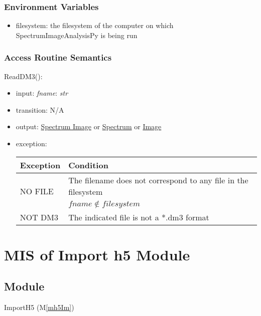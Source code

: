 \documentclass[12pt, titlepage]{article}
\newcommand{\mref}[1]{M\ref{#1}}
\newcommand{\progname}{SpectrumImageAnalysisPy}
\begin{document}
\subsubsection{Environment Variables}
\begin{itemize}
    \item filesystem: the filesystem of the computer on which \progname{} is being
    run
\end{itemize}
\subsubsection{Access Routine Semantics}

\noindent ReadDM3():
\begin{itemize}
    \item input: \textit{fname}: \textit{str}
    \item transition: N/A
    \item output: \hyperref[Mod:SI]{Spectrum Image} or
    \hyperref[Mod:Spectrum]{Spectrum} or \hyperref[Mod:Image]{Image}
    \item exception: 
    \begin{center}
        \begin{tabular}{p{3cm} p{12cm}}
            \toprule[0.15em]
            \textbf{Exception} & \textbf{Condition}\\
            \midrule[0.1em]
            \multirow{2}{0.25\textwidth}{NO FILE} & The filename does not correspond
            to any file in the filesystem\\ 
            & $fname \notin filesystem$\\ 
            \midrule[0.05em]
            NOT DM3 & The indicated file is not a *.dm3 format\\
            \bottomrule[0.15em]
        \end{tabular}
    \end{center}
    
\end{itemize}

\section{MIS of Import h5 Module} \label{Mod:ImportH5} 

\subsection{Module}
ImportH5 (\mref{mh5Im})
\end{document}
